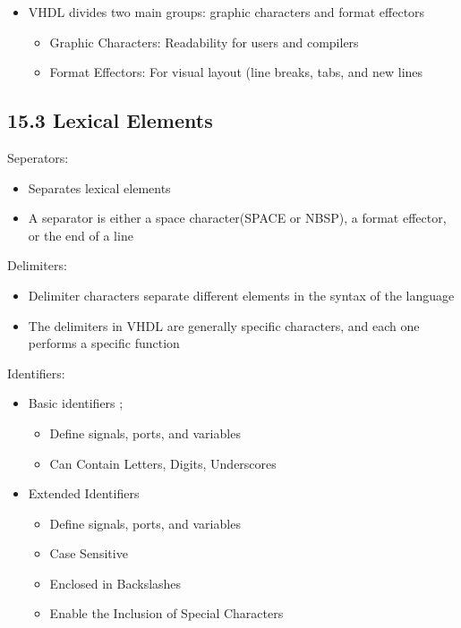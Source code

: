 \documentclass[a4paper,12pt]{article}
\begin{document}
	\begin{itemize}
		\item VHDL divides two main groups: graphic characters and format effectors
		\begin{itemize}
			\item Graphic Characters: Readability for users and compilers
			\item Format Effectors: For visual layout (line breaks, tabs, and new lines
		\end{itemize}
	\end{itemize}
	
	\subsection*{15.3 Lexical Elements}
	Seperators:
	\begin{itemize}
		\item Separates lexical elements 
		\item A separator is either a space character(SPACE or NBSP), a format effector, or the end of a line
	\end{itemize}
	
	Delimiters:
	\begin{itemize}
		\item Delimiter characters separate different elements in the syntax of the language
		\item The delimiters in VHDL are generally specific characters, and each one performs a specific function
	\end{itemize}
	
	Identifiers:
	\begin{itemize}
		\item Basic identifiers ;
		\begin{itemize}
			\item Define signals, ports, and variables
			\item Can Contain Letters, Digits, Underscores
		\end{itemize} 
		\item Extended Identifiers
		\begin{itemize}
			\item Define signals, ports, and variables
			\item Case Sensitive
			\item Enclosed in Backslashes
			\item Enable the Inclusion of Special Characters 
		\end{itemize}
	\end{itemize}
	
\end{document}
